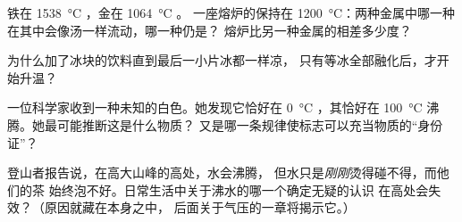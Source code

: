 \begin{exercise}[$\star$]\label{exo:g4:changes-of-state:8}
铁在 \qty{1538}{\celsius} ，金在 \qty{1064}{\celsius} 。
一座熔炉的保持在 \qty{1200}{\celsius}：两种金属中哪一种
在其中会像汤一样流动，哪一种仍是？
熔炉比另一种金属的相差多少度？
\end{exercise}

\begin{exercise}[$\star$]\label{exo:g4:changes-of-state:9}
为什么加了冰块的饮料直到最后一小片冰都一样凉，
只有等冰全部融化后，才开始升温？
\end{exercise}

\begin{exercise}[$\star\star$]\label{exo:g4:changes-of-state:10}
一位科学家收到一种未知的白色。她发现它恰好在
\qty{0}{\celsius} ，其恰好在
\qty{100}{\celsius} 沸腾。她最可能推断这是什么物质？
又是哪一条规律使标志可以充当物质的“身份证”？
\end{exercise}

\begin{exercise}[$\star\star$]\label{exo:g4:changes-of-state:11}
登山者报告说，在高大山峰的高处，水会沸腾，
但水只是\emph{刚刚}烫得碰不得，而他们的茶
始终泡不好。日常生活中关于沸水的哪一个确定无疑的认识
在高处会失效？（原因就藏在本身之中，
后面关于气压的一章将揭示它。）
\end{exercise}
